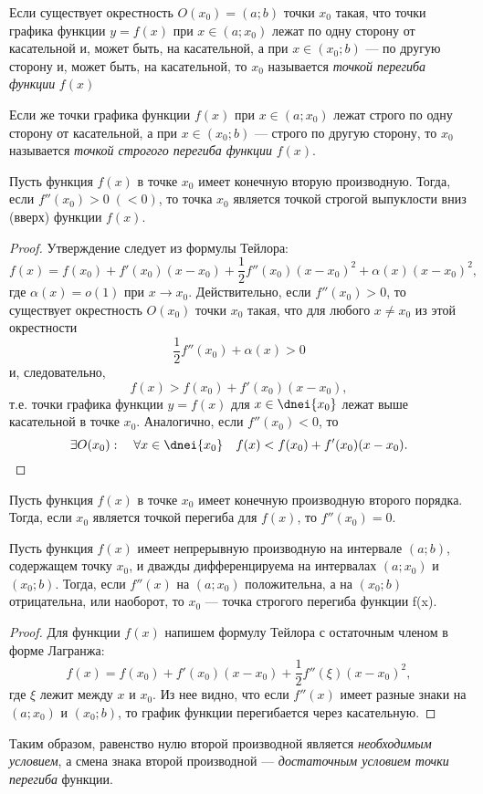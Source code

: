\begin{defn}
Если существует окрестность $O(x_0)=(a;b)$ точки $x_0$ такая, что точки графика функции $y=f(x)$ при $x\in (a;x_0)$ лежат по одну сторону от касательной и, может быть, на касательной, а при $x\in(x_0;b)$ --- по другую сторону и, может быть, на касательной, то $x_0$ называется \textit{точкой перегиба функции} $f(x)$

Если же точки графика функции $f(x)$ при $x\in(a;x_0)$ лежат строго по одну сторону от касательной, а при $x\in (x_0;b)$ --- строго по другую сторону, то $x_0$ называется \textit{точкой строгого перегиба функции} $f(x)$.
\end{defn}

\begin{thm}
Пусть функция $f(x)$ в точке $x_0$ имеет конечную вторую производную. Тогда, если $f''(x_0)>0\; (<0)$, то точка $x_0$ является точкой строгой выпуклости вниз (вверх) функции $f(x)$. 
\end{thm}

\begin{proof}
Утверждение следует из формулы Тейлора:
$$
f(x)=f(x_0)+f'(x_0)(x-x_0)+\frac{1}{2}f''(x_0)(x-x_0)^2+\alpha(x)(x-x_0)^2,
$$
где $\alpha(x)=o(1)$ при $x\to x_0$. Действительно, если $f''(x_0)>0$, то существует окрестность $O(x_0)$ точки $x_0$ такая, что для любого $x\neq x_0$ из этой окрестности
$$
\frac{1}{2}f''(x_0)+\alpha(x)>0
$$
и, следовательно, 
$$
f(x)>f(x_0)+f'(x_0)(x-x_0),
$$
т.е. точки графика функции $y=f(x)$ для $x\in\dnei {x_0}$ лежат выше касательной в точке $x_0$. Аналогично, если $f''(x_0)<0$, то
$$
\exists O(x_0):\quad \forall x\in \dnei {x_0} \quad f(x)<f(x_0)+f'(x_0)(x-x_0).
$$
\end{proof}

\begin{cons}
Пусть функция $f(x)$ в точке $x_0$ имеет конечную производную второго порядка. Тогда, если $x_0$ является точкой перегиба для $f(x)$, то $f''(x_0)=0$.
\end{cons}

\begin{thm}
Пусть функция $f(x)$ имеет непрерывную производную на интервале $(a;b)$, содержащем точку $x_0$, и дважды дифференцируема на интервалах $(a;x_0)$ и $(x_0;b)$. Тогда, если $f''(x)$ на $(a;x_0)$ положительна, а на $(x_0;b)$ отрицательна, или наоборот, то $x_0$ --- точка строгого перегиба функции f(x). 
\end{thm}

\begin{proof}
Для функции $f(x)$ напишем формулу Тейлора с остаточным членом в форме Лагранжа:
$$
f(x)=f(x_0)+f'(x_0)(x-x_0)+\frac{1}{2}f''(\xi)(x-x_0)^2,
$$
где $\xi$ лежит между $x$ и $x_0$. Из нее видно, что если $f''(x)$ имеет разные знаки на $(a;x_0)$ и $(x_0;b)$, то график функции перегибается через касательную.
\end{proof}

Таким образом, равенство нулю второй производной является \textit{необходимым условием}, а смена знака второй производной --- \textit{достаточным условием точки перегиба} функции.

